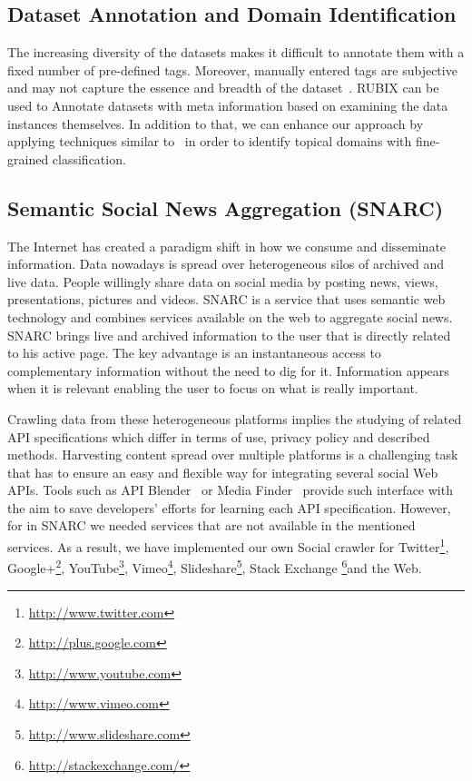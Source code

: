\documentclass[onecolumn, crcready]{../../Util/LaTEX/iosart2c}
\begin{document}
\subsection{Dataset Annotation and Domain Identification}

The increasing diversity of the datasets makes it difficult to annotate them with a fixed number of pre-defined tags. Moreover, manually entered tags are subjective and may not capture the essence and breadth of the dataset~\cite{Lalithsena:WI:13}. RUBIX can be used to Annotate datasets with meta information based on examining the data instances themselves. In addition to that, we can enhance our approach by applying techniques similar to~\cite{Lalithsena:WI:13} in order to identify topical domains with fine-grained classification.

\subsection{Semantic Social News Aggregation (SNARC)}

The Internet has created a paradigm shift in how we consume and disseminate information. Data nowadays is spread over heterogeneous silos of archived and live data. People willingly share data on social media by posting news, views, presentations, pictures and videos. SNARC is a service that uses semantic web technology and combines services available on the web to aggregate social news. SNARC brings live and archived information to the user that is directly related to his active page. The key advantage is an instantaneous access to complementary information without the need to dig for it. Information appears when it is relevant enabling the user to focus on what is really important.

Crawling data from these heterogeneous platforms implies the studying of related API specifications which differ in terms of use, privacy policy and described methods. Harvesting content spread over multiple platforms is a challenging task that has to ensure an easy and flexible way for integrating several social Web APIs. Tools such as API Blender~\cite{Gouriten:WWW:12} or Media Finder~\cite{Hyunmo:HCI:03} provide such interface with the aim to save developers' efforts for learning each API specification. However, for in SNARC we needed services that are not available in the mentioned services. As a result, we have implemented our own Social crawler for Twitter\footnote{\url{http://www.twitter.com}}, Google+\footnote{\url{http://plus.google.com}}, YouTube\footnote{\url{http://www.youtube.com}}, Vimeo\footnote{\url{http://www.vimeo.com}}, Slideshare\footnote{\url{http://www.slideshare.com}}, Stack Exchange \footnote{\url{http://stackexchange.com/}}and the Web.
\end{document}
